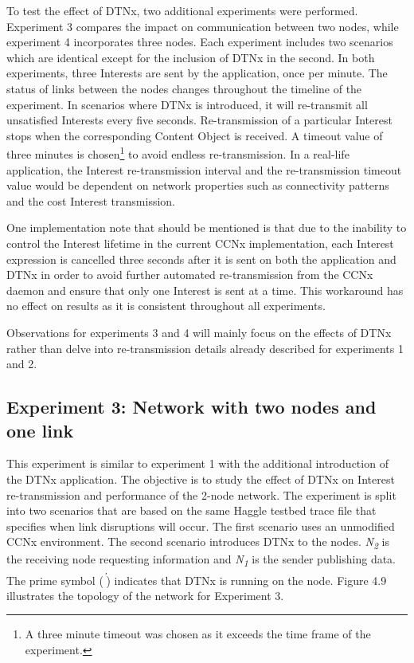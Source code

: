 \documentclass[a4paper,12pt]{report}      %
\begin{document}
To test the effect of DTNx, two additional experiments were performed. Experiment 3 compares the
impact on communication between two nodes, while experiment 4 incorporates three nodes. Each
experiment includes two scenarios which are identical except for the inclusion of DTNx in the second.
In both experiments, three Interests are sent by the application, once per minute. The status of links
between the nodes changes throughout the timeline of the experiment. In scenarios where DTNx is
introduced, it will re-transmit all unsatisfied Interests every five seconds. Re-transmission of a particular
Interest stops when the corresponding Content Object is received. A timeout value of 
three minutes is chosen\footnote{A three minute timeout was chosen as it exceeds the time frame of the experiment.} to avoid endless re-transmission. In a real-life application, the Interest re-transmission interval and the re-transmission timeout value would be dependent on network properties such as connectivity patterns and the cost Interest transmission.

One implementation note that should be mentioned is that due to the inability to control the Interest lifetime
 in the current CCNx implementation, each Interest expression is cancelled three seconds after it is sent on
 both the application and DTNx in order to avoid further automated re-transmission from the CCNx daemon and
 ensure that only one Interest is sent at a time. This workaround has no effect on results as it is consistent 
throughout all experiments.

Observations for experiments 3 and 4 will mainly focus on the effects of DTNx rather than delve into
re-transmission details already described for experiments 1 and 2.

\subsection{Experiment 3: Network with two nodes and one link}

This experiment is similar to experiment 1 with the additional introduction of the DTNx application. The objective is to study the effect of DTNx on Interest re-transmission and performance of the 2-node network. The experiment is split into two scenarios that are based on the same Haggle testbed trace file that specifies when link disruptions will occur. The first scenario uses an unmodified CCNx environment. The second scenario introduces DTNx to the nodes. \emph{N\textsubscript{2}} is the receiving node requesting information and \emph{N\textsubscript{1}} is the sender publishing data. The prime symbol (\emph{\textsuperscript{'}}) indicates that DTNx is running on the node. Figure 4.9 illustrates the topology of the network for Experiment 3.
\end{document}
